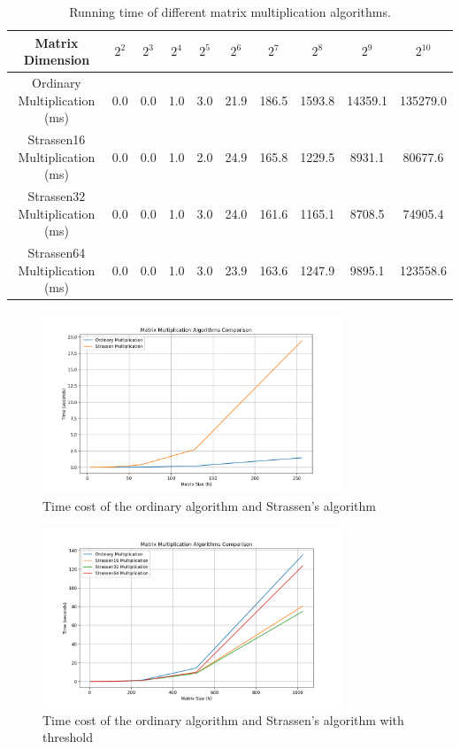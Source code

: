 \documentclass[UTF8]{ctexart}
\begin{document}
\medskip
\begin{table}[h]
    \centering
    \caption{Running time of different matrix multiplication algorithms.}
    \begin{tabular}{|c|c|c|c|c|c|c|c|c|c|}
    \hline
    Matrix Dimension & $2^2$ & $2^3$ & $2^4$ & $2^5$ & $2^6$ & $2^7$ & $2^8$ & $2^9$ & $2^{10}$ \\
    \hline
    Ordinary Multiplication (ms) & 0.0 & 0.0 & 1.0 & 3.0 & 21.9 & 186.5 & 1593.8 & 14359.1 & 135279.0 \\
    \hline
    Strassen16 Multiplication (ms) & 0.0 & 0.0 & 1.0 & 2.0 & 24.9 & 165.8 & 1229.5 & 8931.1 & 80677.6 \\
    \hline
    Strassen32 Multiplication (ms) & 0.0 & 0.0 & 1.0 & 3.0 & 24.0 & 161.6 & 1165.1 & 8708.5 & 74905.4 \\
    \hline
    Strassen64 Multiplication (ms) & 0.0 & 0.0 & 1.0 & 3.0 & 23.9 & 163.6 & 1247.9 & 9895.1 & 123558.6 \\
    \hline
    \end{tabular}

\end{table}  
\begin{figure}[H]
    \centering
    \includegraphics[width=0.8\textwidth]{Strassen_raw.png}
    \caption{Time cost of the ordinary algorithm and Strassen's algorithm}
\end{figure}
\medskip
\begin{figure}[H]
    \centering
    \includegraphics[width=0.8\textwidth]{Strassen_revised.png}
    \caption{Time cost of the ordinary algorithm and Strassen's algorithm with threshold}
\end{figure}
\end{document}
